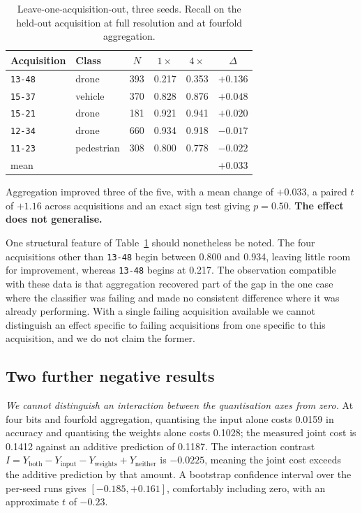 \documentclass[conference]{IEEEtran}
\begin{document}
\begin{table}[t]
\caption{Leave-one-acquisition-out, three seeds. Recall on the held-out
acquisition at full resolution and at fourfold aggregation.}
\label{tab:loo}
\centering
\small
\setlength{\tabcolsep}{4pt}
\begin{tabular}{llcccc}
\toprule
Acquisition & Class & $N$ & $1\times$ & $4\times$ & $\Delta$ \\
\midrule
\texttt{13-48} & drone  & 393 & 0.217 & 0.353 & $+0.136$ \\
\texttt{15-37} & vehicle& 370 & 0.828 & 0.876 & $+0.048$ \\
\texttt{15-21} & drone  & 181 & 0.921 & 0.941 & $+0.020$ \\
\texttt{12-34} & drone  & 660 & 0.934 & 0.918 & $-0.017$ \\
\texttt{11-23} & pedestrian & 308 & 0.800 & 0.778 & $-0.022$ \\
\midrule
\multicolumn{3}{l}{mean} & & & $+0.033$ \\
\bottomrule
\end{tabular}
\end{table}

Aggregation improved three of the five, with a mean change of $+0.033$, a
paired $t$ of $+1.16$ across acquisitions and an exact sign test giving
$p=0.50$. \textbf{The effect does not generalise.}

One structural feature of Table~\ref{tab:loo} should nonetheless be noted.
The four acquisitions other than \texttt{13-48} begin between 0.800 and
0.934, leaving little room for improvement, whereas \texttt{13-48} begins at
0.217. The observation compatible with these data is that aggregation
recovered part of the gap in the one case where the classifier was failing
and made no consistent difference where it was already performing. With a
single failing acquisition available we cannot distinguish an effect specific
to failing acquisitions from one specific to this acquisition, and we do not
claim the former.

\subsection{Two further negative results}

\emph{We cannot distinguish an interaction between the quantisation axes
from zero.} At four bits and fourfold aggregation, quantising the input alone
costs 0.0159 in accuracy and quantising the weights alone costs 0.1028; the
measured joint cost is 0.1412 against an additive prediction of 0.1187. The interaction contrast $I = Y_{\mathrm{both}} - Y_{\mathrm{input}} -
Y_{\mathrm{weights}} + Y_{\mathrm{neither}}$ is $-0.0225$, meaning the joint
cost exceeds the additive prediction by that amount. A bootstrap confidence
interval over the per-seed runs gives $[-0.185, +0.161]$, comfortably
including zero, with an approximate $t$ of $-0.23$.
\end{document}

